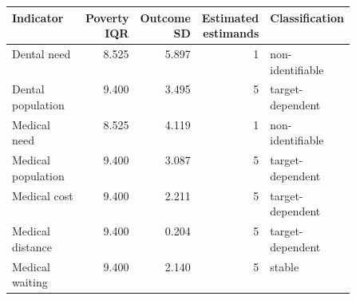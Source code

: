 \begin{tabular}{p{0.28\linewidth}rrrp{0.22\linewidth}}
\toprule
Indicator & Poverty IQR & Outcome SD & Estimated estimands & Classification \\
\midrule
Dental need & 8.525 & 5.897 & 1 & non-identifiable \\
Dental population & 9.400 & 3.495 & 5 & target-dependent \\
Medical need & 8.525 & 4.119 & 1 & non-identifiable \\
Medical population & 9.400 & 3.087 & 5 & target-dependent \\
Medical cost & 9.400 & 2.211 & 5 & target-dependent \\
Medical distance & 9.400 & 0.204 & 5 & target-dependent \\
Medical waiting & 9.400 & 2.140 & 5 & stable \\
\bottomrule
\end{tabular}
